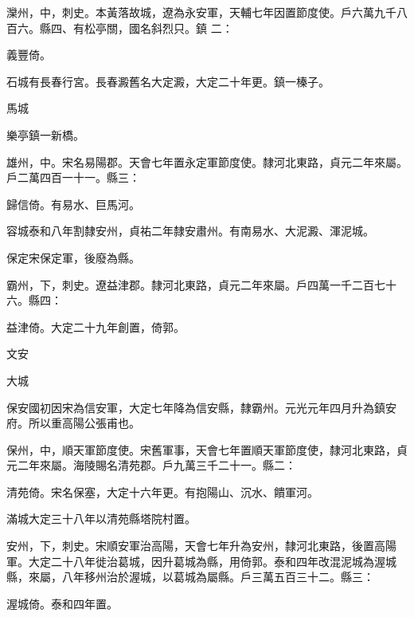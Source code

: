 \begin{pinyinscope}
 灤州，中，刺史。本黃落故城，遼為永安軍，天輔七年因置節度使。戶六萬九千八百六。縣四、有松亭關，國名斜烈只。鎮
 二：



 義豐倚。



 石城有長春行宮。長春澱舊名大定澱，大定二十年更。鎮一榛子。



 馬城



 樂亭鎮一新橋。



 雄州，中。宋名易陽郡。天會七年置永定軍節度使。隸河北東路，貞元二年來屬。戶二萬四百一十一。縣三：



 歸信倚。有易水、巨馬河。



 容城泰和八年割隸安州，貞祐二年隸安肅州。有南易水、大泥澱、渾泥城。



 保定宋保定軍，後廢為縣。



 霸州，下，刺史。遼益津郡。隸河北東路，貞元二年來屬。戶四萬一千二百七十六。縣四：



 益津倚。大定二十九年創置，倚郭。



 文安



 大城



 保安國初因宋為信安軍，大定七年降為信安縣，隸霸州。元光元年四月升為鎮安府。所以重高陽公張甫也。



 保州，中，順天軍節度使。宋舊軍事，天會七年置順天軍節度使，隸河北東路，貞元二年來屬。海陵賜名清苑郡。戶九萬三千二十一。縣二：



 清苑倚。宋名保塞，大定十六年更。有抱陽山、沉水、饋軍河。



 滿城大定三十八年以清苑縣塔院村置。



 安州，下，刺史。宋順安軍治高陽，天會七年升為安州，隸河北東路，後置高陽軍。大定二十八年徙治葛城，因升葛城為縣，用倚郭。泰和四年改混泥城為渥城縣，來屬，八年移州治於渥城，以葛城為屬縣。戶三萬五百三十二。縣三：



 渥城倚。泰和四年置。




\end{pinyinscope}
